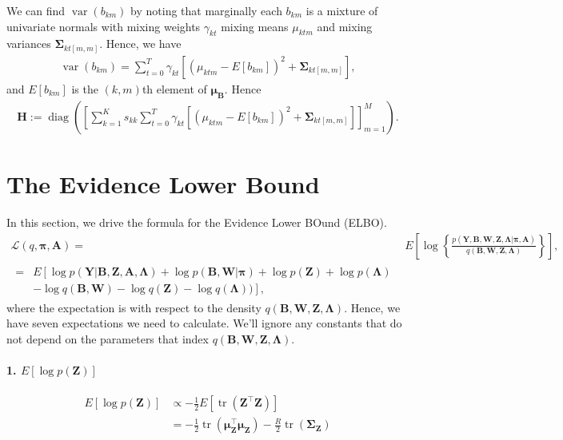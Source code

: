 \documentclass[11pt,authoryear]{article}
\DeclareMathOperator*{\diag}{diag}
\DeclareMathOperator*{\var}{var}
\DeclareMathOperator*{\tr}{tr}
\newcommand{\bs}[1]{\boldsymbol{#1}}
\begin{document}
We can find $\var(b_{km})$ by noting that marginally each $b_{km}$ is
a mixture of univariate normals with mixing weights $\gamma_{kt}$
mixing means $\mu_{ktm}$ and mixing variances $\bs{\Sigma}_{kt[m, m]}$. Hence, we have
\begin{align}
\var(b_{km}) = \sum_{t = 0}^T\gamma_{kt}\left[\left(\mu_{ktm} - E[b_{km}]\right)^2 + \bs{\Sigma}_{kt[m, m]}\right],
\end{align}
and $E[b_{km}]$ is the $(k,m)$th element of $\bs{\mu}_{\bs{B}}$. Hence
\begin{align}
\bs{H} := \diag\left(\left[\sum_{k = 1}^Ks_{kk}\sum_{t = 0}^T\gamma_{kt}\left[\left(\mu_{ktm} - E[b_{km}]\right)^2 + \bs{\Sigma}_{kt[m, m]}\right]\right]_{m = 1}^{M}\right).
\end{align}


\section{The Evidence Lower Bound}
In this section, we drive the formula for the Evidence Lower BOund (ELBO).
\begin{align}
\mathcal{L}(q, \bs{\pi}, \bs{A}) =& E\left[\log\left\{\frac{p(\bs{Y},\bs{B},\bs{W},\bs{Z},\bs{\Lambda}|\bs{\pi},\bs{A})}{q(\bs{B}, \bs{W}, \bs{Z}, \bs{\Lambda})}\right\}\right],\\
\begin{split}
=& E\left[\log p(\bs{Y}|\bs{B}, \bs{Z}, \bs{A}, \bs{\Lambda}) + \log p(\bs{B}, \bs{W} | \bs{\pi}) + \log p(\bs{Z}) + \log p(\bs{\Lambda})\right.\\
&\left. - \log q(\bs{B}, \bs{W}) - \log q(\bs{Z}) - \log q(\bs{\Lambda}))\right],
\end{split}
\end{align}
where the expectation is with respect to the density $q(\bs{B},
\bs{W}, \bs{Z}, \bs{\Lambda})$. Hence, we have seven expectations we
need to calculate. We'll ignore any constants that do not depend on
the parameters that index $q(\bs{B}, \bs{W}, \bs{Z}, \bs{\Lambda})$.

\paragraph{1. $E[\log p(\bs{Z})]$}
\begin{align}
E[\log p(\bs{Z})] &\propto -\frac{1}{2}E\left[\tr(\bs{Z}^{\intercal}\bs{Z})\right]\\
&= -\frac{1}{2} \tr(\bs{\mu}_{\bs{Z}}^{\intercal}\bs{\mu}_{\bs{Z}}) - \frac{R}{2}\tr(\bs{\Sigma}_{\bs{Z}})
\end{align}
\end{document}
